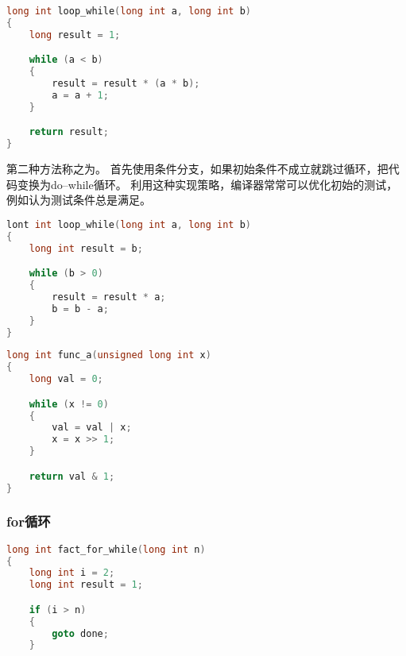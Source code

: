 {{{            %
            \begin{practicec}
                \begin{lstlisting}[language=C]
long int loop_while(long int a, long int b)
{
    long result = 1;

    while (a < b)
    {
        result = result * (a * b);
        a = a + 1;
    }

    return result;
}
                \end{lstlisting}
            \end{practicec}

            第二种方法称之为。
            首先使用条件分支，如果初始条件不成立就跳过循环，把代码变换为do--while循环。
            利用这种实现策略，编译器常常可以优化初始的测试，例如认为测试条件总是满足。

            \begin{practicec}
                \begin{lstlisting}[language=C]
lont int loop_while(long int a, long int b)
{
    long int result = b;

    while (b > 0)
    {
        result = result * a;
        b = b - a;
    }
}
                \end{lstlisting}
            \end{practicec}

            \begin{practicec}
                \begin{lstlisting}[language=C]
long int func_a(unsigned long int x)
{
    long val = 0;

    while (x != 0)
    {
        val = val | x;
        x = x >> 1;
    }

    return val & 1;
}
                \end{lstlisting}
            \end{practicec}
        }

        \subsubsection{for循环}
        {
            \begin{practicec}
                \begin{lstlisting}[language=C]
long int fact_for_while(long int n)
{
    long int i = 2;
    long int result = 1;

    if (i > n)
    {
        goto done;
    }


\end{lstlisting}
\end{practicec}}}}
